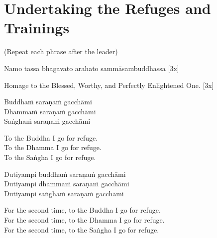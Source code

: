 \section{Undertaking the Refuges and Trainings}

\vspace{1em}

\begin{center}
  \textbf{}\hyperlink{endnote138-appendix}{\hypertarget{endnote138-body}{}}
\end{center}

\begin{center}
  (Repeat each phrase after the leader)
\end{center}

Namo tassa bhagavato arahato sammāsambuddhassa \hfill{[3x]}

\begin{english}
  Homage to the Blessed, Worthy, and Perfectly Enlightened One. \hfill{[3x]}
\end{english}

Buddhaṁ saraṇaṁ gacchāmi\\
Dhammaṁ saraṇaṁ gacchāmi\\
Saṅghaṁ saraṇaṁ gacchāmi

\begin{english-verses}
  To the Buddha I go for refuge.\\
  To the Dhamma I go for refuge.\\
  To the Saṅgha I go for refuge.
\end{english-verses}

Dutiyampi buddhaṁ saraṇaṁ gacchāmi\\
Dutiyampi dhammaṁ saraṇaṁ gacchāmi\\
Dutiyampi saṅghaṁ saraṇaṁ gacchāmi

\begin{english-verses}
  For the second time, to the Buddha I go for refuge.\\
  For the second time, to the Dhamma I go for refuge.\\
  For the second time, to the Saṅgha I go for refuge.
\end{english-verses}

